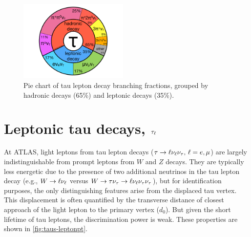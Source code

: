 \begin{figure}[tp]
  \centering
  \includegraphics[width=0.48\textwidth]{figures/piecharts/taudecay}
  \caption{Pie chart of tau lepton decay branching fractions, grouped by hadronic decays (65\%) and leptonic decays (35\%).}
  \label{fig:taus-decaypie}
\end{figure}


\section{Leptonic tau decays, $\tau_\ell$}
\label{sec:taus-leptons}

At ATLAS, light leptons from tau lepton decays ($\tau \rightarrow \ell\nu_\ell\nu_\tau \text{, } \ell = e,\mu$) are largely indistinguishable from prompt leptons from $W$ and $Z$ decays. They are typically less energetic due to the presence of two additional neutrinos in the tau lepton decay (e.g., $W \rightarrow \ell\nu_\ell$ versus $W \rightarrow \tau\nu_\tau \rightarrow \ell\nu_\ell\nu_\tau\nu_\tau$), but for identification purposes, the only distinguishing features arise from the displaced tau vertex. This displacement is often quantified by the transverse distance of closest approach of the light lepton to the primary vertex ($d_0$). But given the short lifetime of tau leptons, the discrimination power is weak. These properties are shown in \cref{fig:taus-leptonpt}.

